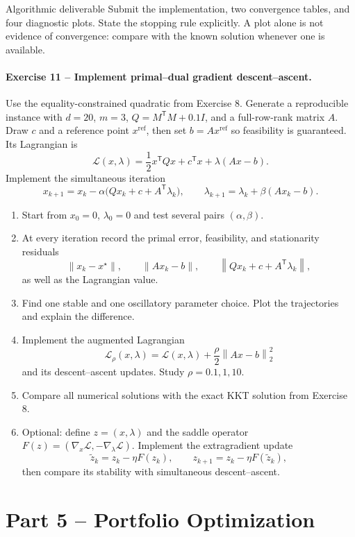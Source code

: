 \documentclass[10pt]{article}
\newcommand{\trans}{^{\mathsf T}}
\newcommand{\norm}[1]{\left\lVert#1\right\rVert}
\begin{document}
\begin{deliverablebox}{Algorithmic deliverable}
Submit the implementation, two convergence tables, and four diagnostic plots.
State the stopping rule explicitly. A plot alone is not evidence of
convergence: compare with the known solution whenever one is available.
\end{deliverablebox}

\paragraph{Exercise 11 -- Implement primal--dual gradient descent--ascent.}
Use the equality-constrained quadratic from Exercise 8. Generate a reproducible
instance with $d=20$, $m=3$, $Q=M\trans M+0.1I$, and a full-row-rank matrix
$A$. Draw $c$ and a reference point $x^{\mathrm{ref}}$, then set
$b=Ax^{\mathrm{ref}}$ so feasibility is guaranteed. Its Lagrangian is
\[
\mathcal L(x,\lambda)
=\frac12x\trans Qx+c\trans x+\lambda(Ax-b).
\]
Implement the simultaneous iteration
\[
x_{k+1}=x_k-\alpha\bigl(Qx_k+c+A\trans\lambda_k\bigr),
\qquad
\lambda_{k+1}=\lambda_k+\beta(Ax_k-b).
\]
\begin{enumerate}
\item Start from $x_0=0$, $\lambda_0=0$ and test several pairs
$(\alpha,\beta)$.
\item At every iteration record the primal error, feasibility, and stationarity
residuals
\[
\norm{x_k-x^\star},\qquad
\norm{Ax_k-b},\qquad
\norm{Qx_k+c+A\trans\lambda_k},
\]
as well as the Lagrangian value.
\item Find one stable and one oscillatory parameter choice. Plot the
trajectories and explain the difference.
\item Implement the augmented Lagrangian
\[
\mathcal L_\rho(x,\lambda)=\mathcal L(x,\lambda)
+\frac\rho2\norm{Ax-b}_2^2
\]
and its descent--ascent updates. Study $\rho=0.1,1,10$.
\item Compare all numerical solutions with the exact KKT solution from
Exercise 8.
\item Optional: define $z=(x,\lambda)$ and the saddle operator
$F(z)=(\nabla_x\mathcal L,-\nabla_\lambda\mathcal L)$. Implement the
extragradient update
\[
  \widetilde z_k=z_k-\eta F(z_k),
  \qquad z_{k+1}=z_k-\eta F(\widetilde z_k),
\]
then compare its stability with simultaneous descent--ascent.
\end{enumerate}

\section{Part 5 -- Portfolio Optimization}
\end{document}
